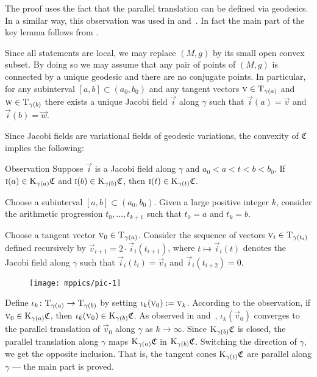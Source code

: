\documentclass[a4paper,10pt]{article}
\begin{document}
The proof uses the fact that the parallel translation can be defined via geodesics.
In a similar way, this observation was used in \cite[Section 13]{Ber-Nik} and~\cite{Petruninpar}.
In fact the main part of the key lemma follows from
\cite{Petruninpar}.

Since all statements are local, we may replace $(M,g)$ by its small open convex subset.
By doing so we may assume that any pair of points of $(M,g)$ is connected by a unique geodesic and there are no conjugate points.
In particular, for any subinterval $[a,b]\subset (a_0,b_0)$ and any tangent vectors $\text{\sc{v}} \in \mathrm{T}_{\gamma (a)}$ and $\text{\sc{w}} \in \mathrm{T}_{\gamma (b)}$ there exists a unique Jacobi field $\vec i$ along $\gamma$ 
such that $\vec i(a)=\vec{v}$ and~$\vec i(b)=\vec{w}$.

Since Jacobi fields are variational fields of geodesic variations, 
the convexity of $\mathfrak{C}$ implies the following: 

\begin{thm}{Observation}
Suppose $\vec i$ is a Jacobi field along %
$\gamma$ and $a_0<a<t<b<b_0$.
If 
$\text{\sc{i}}(a)\in \mathrm{K}_{\gamma(a)}\mathfrak{C}$ and $\text{\sc{i}}(b)\in \mathrm{K}_{\gamma(b)}\mathfrak{C}$,
then $\text{\sc{i}}(t)\in \mathrm{K}_{\gamma(t)}\mathfrak{C}$.
\end{thm}

Choose a subinterval $[a,b] \subset (a_0,b_0)$.
Given a large positive integer $k$, consider the arithmetic progression
$t_0,\dots,t_{k+1}$ such that $t_0=a$ and $t_k=b$.

Choose a tangent vector $\text{\sc{v}}_0\in\mathrm{T}_{\gamma(a)}$.
Consider the sequence of vectors $\vec{v}_i\z\in\T_{\gamma(t_i)}$ defined recursively by $\vec{v}_{i+1}=2\cdot \vec i_i(t_{i+1})$, where $t\mapsto \vec i_i(t)$ denotes the Jacobi field along $\gamma$ such that $\vec i_i(t_i)=\vec{v}_i$ and $\vec i_i(t_{i+2})=0$.

\begin{figure}[ht!]\vskip-0mm\centering\texttt{[image: mppics/pic-1]}\end{figure}

Define $\iota_k\colon\mathrm{T}_{\gamma(a)}\to \mathrm{T}_{\gamma(b)}$ by setting $\iota_k(\text{\sc{v}}_0)\mathrel{{:}{=}} \text{\sc{v}}_k$.
According to the observation, if $\text{\sc{v}}_0\in \mathrm{K}_{\gamma(a)}\mathfrak{C}$, then $\iota_k(\text{\sc{v}}_0)\in \mathrm{K}_{\gamma(b)}\mathfrak{C}$.
As observed in \cite{Ber-Nik} and~\cite{Petruninpar}, $\iota_k(\vec v_0)$ converges to the parallel translation of $\vec v_0$ along $\gamma$ as $k\to \infty$.
Since $\mathrm{K}_{\gamma(b)}\mathfrak{C}$ is closed,
the parallel translation along $\gamma$ maps $\mathrm{K}_{\gamma(a)}\mathfrak{C}$ in $\mathrm{K}_{\gamma(b)}\mathfrak{C}$.
Switching the direction of $\gamma$, we get the opposite inclusion.
That is, the tangent cones $\mathrm{K}_{\gamma(t)}\mathfrak{C}$ are parallel along $\gamma$ --- the main part is proved.
\end{document}
